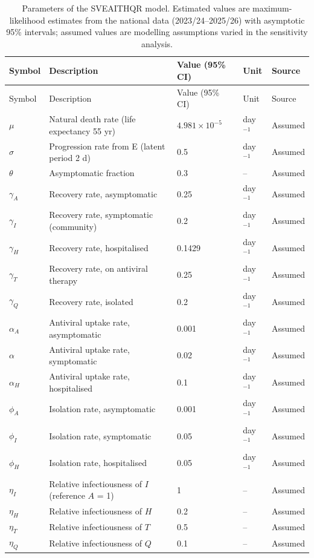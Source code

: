 \begin{longtable}{llll l}
\caption{Parameters of the SVEAITHQR model. Estimated values are maximum-likelihood
estimates from the national data (2023/24--2025/26) with asymptotic 95\% intervals;
assumed values are modelling assumptions varied in the sensitivity analysis.}
\label{tab:parameters}\\
\hline Symbol & Description & Value (95\% CI) & Unit & Source\\ \hline\endfirsthead
\hline Symbol & Description & Value (95\% CI) & Unit & Source\\ \hline\endhead
$\mu$ & Natural death rate (life expectancy 55 yr) & $4.981\times10^{-5}$ & day$^{-1}$ & Assumed\\
$\sigma$ & Progression rate from E (latent period 2 d) & 0.5 & day$^{-1}$ & Assumed\\
$\theta$ & Asymptomatic fraction & 0.3 & -- & Assumed\\
$\gamma_A$ & Recovery rate, asymptomatic & 0.25 & day$^{-1}$ & Assumed\\
$\gamma_I$ & Recovery rate, symptomatic (community) & 0.2 & day$^{-1}$ & Assumed\\
$\gamma_H$ & Recovery rate, hospitalised & 0.1429 & day$^{-1}$ & Assumed\\
$\gamma_T$ & Recovery rate, on antiviral therapy & 0.25 & day$^{-1}$ & Assumed\\
$\gamma_Q$ & Recovery rate, isolated & 0.2 & day$^{-1}$ & Assumed\\
$\alpha_A$ & Antiviral uptake rate, asymptomatic & 0.001 & day$^{-1}$ & Assumed\\
$\alpha$ & Antiviral uptake rate, symptomatic & 0.02 & day$^{-1}$ & Assumed\\
$\alpha_H$ & Antiviral uptake rate, hospitalised & 0.1 & day$^{-1}$ & Assumed\\
$\phi_A$ & Isolation rate, asymptomatic & 0.001 & day$^{-1}$ & Assumed\\
$\phi_I$ & Isolation rate, symptomatic & 0.05 & day$^{-1}$ & Assumed\\
$\phi_H$ & Isolation rate, hospitalised & 0.05 & day$^{-1}$ & Assumed\\
$\eta_I$ & Relative infectiousness of $I$ (reference $A$ = 1) & 1 & -- & Assumed\\
$\eta_H$ & Relative infectiousness of $H$ & 0.2 & -- & Assumed\\
$\eta_T$ & Relative infectiousness of $T$ & 0.5 & -- & Assumed\\
$\eta_Q$ & Relative infectiousness of $Q$ & 0.1 & -- & Assumed\\

\end{longtable}
